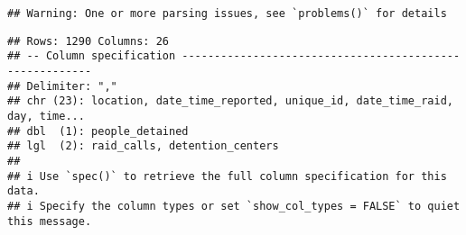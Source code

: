\documentclass[
]{article}
\newenvironment{Shaded}{\begin{snugshade}}{\end{snugshade}}
\newcommand{\AttributeTok}[1]{\textcolor[rgb]{0.13,0.29,0.53}{#1}}
\newcommand{\CommentTok}[1]{\textcolor[rgb]{0.56,0.35,0.01}{\textit{#1}}}
\newcommand{\DecValTok}[1]{\textcolor[rgb]{0.00,0.00,0.81}{#1}}
\newcommand{\FunctionTok}[1]{\textcolor[rgb]{0.13,0.29,0.53}{\textbf{#1}}}
\newcommand{\NormalTok}[1]{#1}
\newcommand{\OtherTok}[1]{\textcolor[rgb]{0.56,0.35,0.01}{#1}}
\newcommand{\SpecialCharTok}[1]{\textcolor[rgb]{0.81,0.36,0.00}{\textbf{#1}}}
\newcommand{\StringTok}[1]{\textcolor[rgb]{0.31,0.60,0.02}{#1}}
\begin{document}
\begin{verbatim}
## Warning: One or more parsing issues, see `problems()` for details
\end{verbatim}

\begin{verbatim}
## Rows: 1290 Columns: 26
## -- Column specification --------------------------------------------------------
## Delimiter: ","
## chr (23): location, date_time_reported, unique_id, date_time_raid, day, time...
## dbl  (1): people_detained
## lgl  (2): raid_calls, detention_centers
## 
## i Use `spec()` to retrieve the full column specification for this data.
## i Specify the column types or set `show_col_types = FALSE` to quiet this message.
\end{verbatim}

\begin{Shaded}
\end{Shaded}
\end{document}
